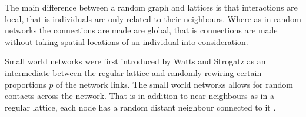 The main difference between a random graph and lattices is that interactions are local, that is individuals are only related to their neighbours. Where as in random networks the connections are made are global, that is connections are made without taking spatial locations of an individual into consideration. 


Small world networks  were first introduced by Watts and Strogatz as an intermediate between the regular lattice and randomly rewiring certain proportions $p$ of the network links\citep{watts1998collective}. The small world networks allows for random contacts across the network. That is in addition to near neighbours as in a regular lattice, each node has a random distant neighbour connected to it \citep{watts1998collective}.
 
  